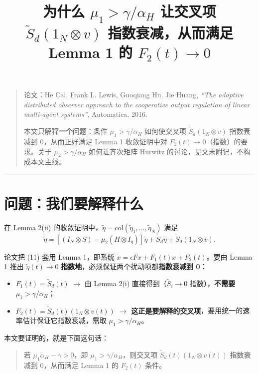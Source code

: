 \documentclass[UTF8]{ctexart}
\title{为什么 $\mu_1 > \gamma / \alpha_H$ 让交叉项 $\tilde{S}_d(1_N \otimes v)$ 指数衰减，从而满足 Lemma 1 的 $F_2(t) \to 0$}
\author{}
\date{}
\begin{document}
\maketitle

\begin{quote}
论文：He Cai, Frank L. Lewis, Guoqiang Hu, Jie Huang,
\emph{``The adaptive distributed observer approach to the cooperative output regulation of linear multi-agent systems''}, Automatica, 2016.

本文只解释\textbf{一个}问题：条件 $\mu_1 > \gamma / \alpha_H$ 如何使交叉项 $\tilde{S}_d(1_N \otimes v)$ 指数衰减到 $0$，从而正好满足 Lemma 1 收敛证明中对 $F_2(t) \to 0$（指数）的要求。关于 $\mu_2 > \gamma / \alpha_H$ 如何让齐次矩阵 Hurwitz 的讨论，见文末附记，不构成本文主线。
\end{quote}

\hrule
\vspace{4mm}

\section{问题：我们要解释什么}

在 Lemma 2(ii) 的收敛证明中，$\tilde{\eta} = \mathrm{col}(\tilde{\eta}_1,\dots,\tilde{\eta}_N)$ 满足
\begin{equation}
\dot{\tilde{\eta}} = [(I_N \otimes S) - \mu_2(H \otimes I_q)] \tilde{\eta} + \tilde{S}_d \tilde{\eta} + \tilde{S}_d (1_N \otimes v). \tag{11}
\end{equation}

论文把 (11) 套用 Lemma 1，即系统 $\dot{x} = \epsilon F x + F_1(t)x + F_2(t)$。要由 Lemma 1 推出 $\tilde{\eta}(t) \to 0$ \textbf{指数地}，必须保证两个扰动项都\textbf{指数衰减到 0}：
\begin{itemize}
  \item $F_1(t) = \tilde{S}_d(t)$ $\to$ 由 Lemma 2(i) 直接得到（$\tilde{S}_i \to 0$ 指数），\textbf{不需要} $\mu_1 > \gamma/\alpha_H$；
  \item \textbf{$F_2(t) = \tilde{S}_d(t)(1_N \otimes v(t))$ $\to$ 这正是要解释的交叉项}，要用统一的速率估计保证它指数衰减，需取 $\mu_1 > \gamma/\alpha_H$。
\end{itemize}

本文要证明的，就是下面这句话：
\begin{quote}
若 $\mu_1 \alpha_H - \gamma > 0$，即 $\mu_1 > \gamma/\alpha_H$，则交叉项 $\tilde{S}_d(t)(1_N \otimes v(t))$ 指数衰减到 $0$，从而满足 Lemma 1 的 $F_2(t)$ 条件。
\end{quote}
\end{document}

